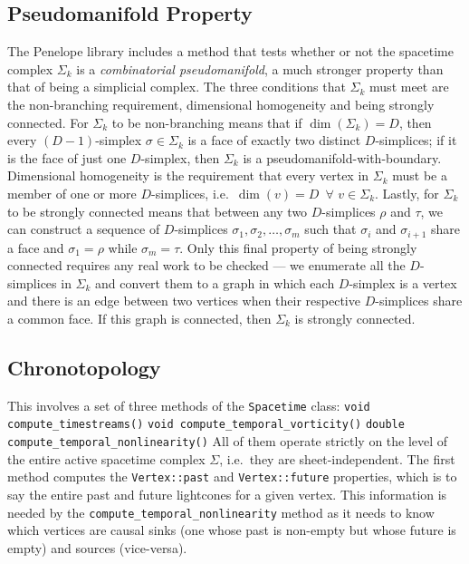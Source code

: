 \documentclass[12pt,letterpaper]{report}
\begin{document}
\subsection{Pseudomanifold Property}  

The Penelope library includes a method that tests whether or not the spacetime complex $\Sigma_k$ is a 
\emph{combinatorial pseudomanifold}, a much stronger property than that of being a simplicial complex. 
The three conditions that $\Sigma_k$ must meet are the non-branching requirement, dimensional homogeneity 
and being strongly connected. For $\Sigma_k$ to be non-branching means that if $\dim(\Sigma_k) = D$, then 
every $(D-1)$-simplex $\sigma\in\Sigma_k$ is a face of exactly two distinct $D$-simplices; if it is the 
face of just one $D$-simplex, then $\Sigma_k$ is a pseudomanifold-with-boundary. Dimensional homogeneity 
is the requirement that every vertex in $\Sigma_k$ must be a member of one or more $D$-simplices, i.e.\ 
$\dim(v) = D \,\,\, \forall \,\, v\in\Sigma_k$. Lastly, for $\Sigma_k$ to be strongly connected means that 
between any two $D$-simplices $\rho$ and $\tau$, we can construct a sequence of $D$-simplices 
$\sigma_1,\sigma_2,\dots,\sigma_m$ such that $\sigma_i$ and $\sigma_{i+1}$ share a face and $\sigma_1 = \rho$ 
while $\sigma_m = \tau$. Only this final property of being strongly connected requires any real work to 
be checked --- we enumerate all the $D$-simplices in $\Sigma_k$ and convert them to a graph in which 
each $D$-simplex is a vertex and there is an edge between two vertices when their respective $D$-simplices 
share a common face. If this graph is connected, then $\Sigma_k$ is strongly connected.    

\subsection{Chronotopology}

This involves a set of three methods of the \texttt{Spacetime} class:\newline
\texttt{void compute\_timestreams()}\newline
\texttt{void compute\_temporal\_vorticity()}\newline
\texttt{double compute\_temporal\_nonlinearity()}\newline
All of them operate strictly on the level of the entire active spacetime complex $\Sigma$, i.e.\ they are 
sheet-independent. The first method computes the \texttt{Vertex::past} and \texttt{Vertex::future} properties, 
which is to say the entire past and future lightcones for a given vertex. This information is needed by 
the \texttt{compute\_temporal\_nonlinearity} method as it needs to know which vertices are causal sinks (one 
whose past is non-empty but whose future is empty) and sources (vice-versa). 
\end{document}

